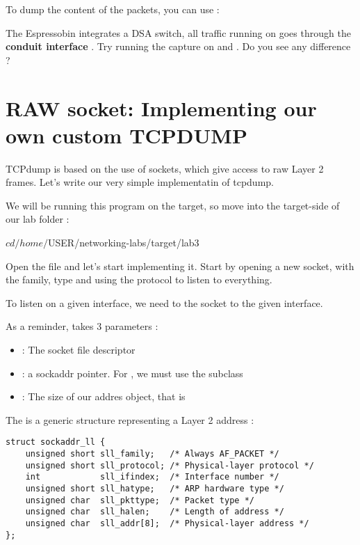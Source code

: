 To dump the content of the packets, you can use :

The Espressobin integrates a DSA switch, all traffic running on  goes through the \textbf{conduit interface} . Try running the capture on  and . Do you see any difference ?

\section{RAW socket: Implementing our own custom TCPDUMP}

TCPdump is based on the use of  sockets, which give access to raw Layer 2 frames. Let's write our very simple implementatin of tcpdump.

We will be running this program on the target, so move into the target-side of our lab folder :

\begin{hostbashinput}
$ cd /home/$USER/networking-labs/target/lab3
\end{hostbashinput}

Open the  file and let's start implementing it. Start by opening a new socket, with the  family,  type and using the  protocol to listen to everything.

To listen on a given interface, we need to  the socket to the given interface.

As a reminder,  takes 3 parameters :
\begin{itemize}
	\item {} : The socket file descriptor
	\item {} : a sockaddr pointer. For , we must use the  subclass
	\item {} : The size of our addres object, that is 
\end{itemize}

The  is a generic structure representing a Layer 2 address :

\begin{verbatim}
struct sockaddr_ll {
    unsigned short sll_family;   /* Always AF_PACKET */
    unsigned short sll_protocol; /* Physical-layer protocol */
    int            sll_ifindex;  /* Interface number */
    unsigned short sll_hatype;   /* ARP hardware type */
    unsigned char  sll_pkttype;  /* Packet type */
    unsigned char  sll_halen;    /* Length of address */
    unsigned char  sll_addr[8];  /* Physical-layer address */
};
\end{verbatim}

